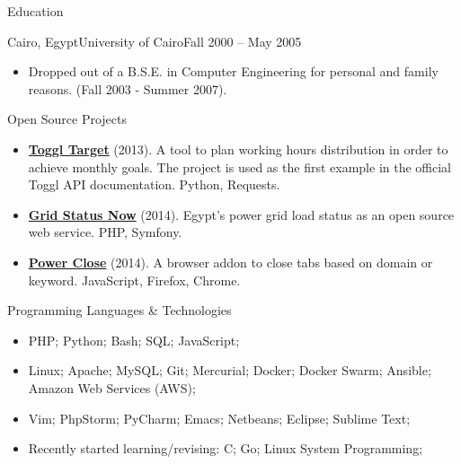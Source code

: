 \documentclass[]{mosabcv}
\begin{document}
    \begin{cvsection}{Education}
        \begin{cvsubsection}{Cairo, Egypt}{University of Cairo}{Fall 2000 -- May 2005}
            \begin{itemize}
                \item Dropped out of a B.S.E. in Computer Engineering for personal and family reasons. (Fall 2003 - Summer 2007).
            \end{itemize}
        \end{cvsubsection}
    \end{cvsection}

    \begin{cvsection}{Open Source Projects}
        \begin{cvsubsection}{}{}{}
            \begin{itemize}
                \item \textbf{\href{https://github.com/mos3abof/toggl_target}{Toggl Target}} (2013). A tool to plan working hours distribution in order to achieve monthly goals. The project is used as the first example in the official Toggl API documentation. Python, Requests.
                \item \textbf{\href{https://www.gridstatusnow.com}{Grid Status Now}} (2014). Egypt's power grid load status as an open source web service. PHP, Symfony.
                \item \textbf{\href{https://power-close.com/}{Power Close}} (2014). A browser addon to close tabs based on domain or keyword. JavaScript, Firefox, Chrome.
            \end{itemize}
        \end{cvsubsection}
    \end{cvsection}

    \begin{cvsection}{Programming Languages \& Technologies}
        \begin{cvsubsection}{}{}{}
            \begin{itemize}
                \item PHP; Python; Bash; SQL; JavaScript;
                \item Linux; Apache; MySQL; Git; Mercurial; Docker; Docker Swarm; Ansible; Amazon Web Services (AWS);
                \item Vim; PhpStorm; PyCharm; Emacs; Netbeans; Eclipse; Sublime Text;
                \item Recently started learning/revising: C; Go; Linux System Programming;
            \end{itemize}
        \end{cvsubsection}
    \end{cvsection}
\end{document}
